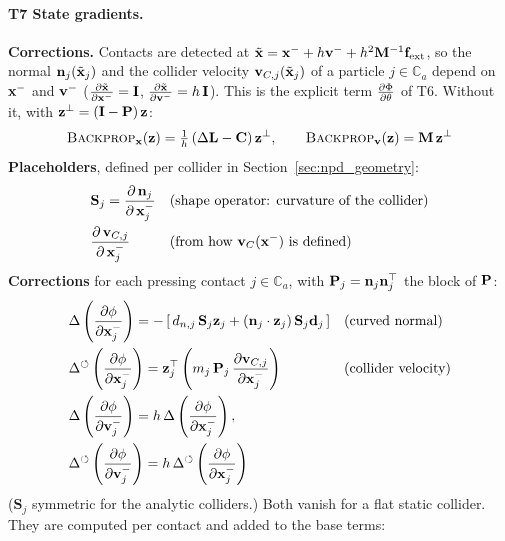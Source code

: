 \paragraph{T7 State gradients.}\mbox{}

\newline \newline \textbf{Corrections.} Contacts are detected at $\tilde{\mathbf{x}} = \mathbf{x}^- + h\mathbf{v}^- + h^2\mathbf{M}^{-1}\mathbf{f}_{\text{ext}}$, so the normal $\mathbf{n}_j(\tilde{\mathbf{x}}_j)$ and the collider velocity $\mathbf{v}_{C,j}(\tilde{\mathbf{x}}_j)$ of a particle $j \in \mathbb{C}_a$ depend on $\mathbf{x}^-$ and $\mathbf{v}^-$ ($\frac{\partial \tilde{\mathbf{x}}}{\partial \mathbf{x}^-} = \mathbf{I}$, $\frac{\partial \tilde{\mathbf{x}}}{\partial \mathbf{v}^-} = h\,\mathbf{I}$). This is the explicit term $\frac{\partial \Phi}{\partial \theta}$ of T6. Without it, with $\mathbf{z}^\perp = \left(\mathbf{I} - \mathbf{P}\right)\mathbf{z}$:
\begin{equation*}
    \textsc{Backprop}_{\mathbf{x}}(\mathbf{z}) = \tfrac{1}{h}\left(\Delta\mathbf{L} - \mathbf{C}\right)\mathbf{z}^\perp,
    \qquad
    \textsc{Backprop}_{\mathbf{v}}(\mathbf{z}) = \mathbf{M}\,\mathbf{z}^\perp
\end{equation*}
\textbf{Placeholders}, defined per collider in Section~\ref{sec:npd_geometry}:
\begin{align*}
    & \mathbf{S}_j = \dfrac{\partial\, \mathbf{n}_j}{\partial\, \mathbf{x}_j^-}        && (\text{shape operator: curvature of the collider}) \\
    & \dfrac{\partial\, \mathbf{v}_{C,j}}{\partial\, \mathbf{x}_j^-}                  && (\text{from how } \mathbf{v}_C(\mathbf{x}^-) \text{ is defined})
\end{align*}
\textbf{Corrections} for each pressing contact $j \in \mathbb{C}_a$, with $\mathbf{P}_j = \mathbf{n}_j\mathbf{n}_j^\top$ the block of $\mathbf{P}$:
\begin{align*}
    &\Delta\left(\frac{\partial \phi}{\partial \mathbf{x}_j^-}\right) = -\left[\,d_{n,j}\,\mathbf{S}_j\mathbf{z}_j + \left(\mathbf{n}_j\cdot\mathbf{z}_j\right)\mathbf{S}_j\mathbf{d}_j\,\right]
    && (\text{curved normal}) \\
    &\Delta^\circlearrowleft\left(\frac{\partial \phi}{\partial \mathbf{x}_j^-}\right) = \mathbf{z}_j^\top\left(m_j\,\mathbf{P}_j\,\frac{\partial \mathbf{v}_{C,j}}{\partial \mathbf{x}_j^-}\right)
    && (\text{collider velocity}) \\
    &\Delta\left(\frac{\partial \phi}{\partial \mathbf{v}_j^-}\right) = h\,\Delta\left(\frac{\partial \phi}{\partial \mathbf{x}_j^-}\right),
    && \\
    &\Delta^\circlearrowleft\left(\frac{\partial \phi}{\partial \mathbf{v}_j^-}\right) = h\,\Delta^\circlearrowleft\left(\frac{\partial \phi}{\partial \mathbf{x}_j^-}\right)
\end{align*}
\noindent ($\mathbf{S}_j$ symmetric for the analytic colliders.) Both vanish for a flat static collider. They are computed per contact and added to the base terms:
